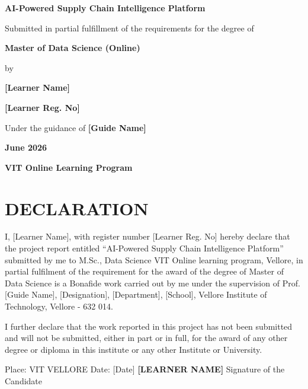 \documentclass[12pt, a4paper]{report}
\begin{document}
\begin{titlepage}
    \centering
    \vspace*{1in}
    {\LARGE \textbf{AI-Powered Supply Chain Intelligence Platform}}\par
    \vspace{1.5in}
    {\large Submitted in partial fulfillment of the requirements for the degree of}\par
    \vspace{0.2in}
    {\Large \textbf{Master of Data Science (Online)}}\par
    \vspace{1in}
    {\large by}\par
    \vspace{0.2in}
    {\Large \textbf{[Learner Name]}}\par
    {\large \textbf{[Learner Reg. No]}}\par
    \vspace{1in}
    {\large Under the guidance of \textbf{[Guide Name]}}\par
    \vspace{1in}
    {\large \textbf{June 2026}}\par
    {\large \textbf{VIT Online Learning Program}}\par
\end{titlepage}


\chapter*{DECLARATION}
I, [Learner Name], with register number [Learner Reg. No] hereby declare that the project report entitled ``AI-Powered Supply Chain Intelligence Platform'' submitted by me to M.Sc., Data Science VIT Online learning program, Vellore, in partial fulfilment of the requirement for the award of the degree of Master of Data Science is a Bonafide work carried out by me under the supervision of Prof. [Guide Name], [Designation], [Department], [School], Vellore Institute of Technology, Vellore - 632 014.

I further declare that the work reported in this project has not been submitted and will not be submitted, either in part or in full, for the award of any other degree or diploma in this institute or any other Institute or University.

\vspace{0.5in}
\noindent Place: VIT VELLORE \newline
Date: [Date] \hfill \textbf{[LEARNER NAME]} \newline
\null \hfill Signature of the Candidate
\end{document}
